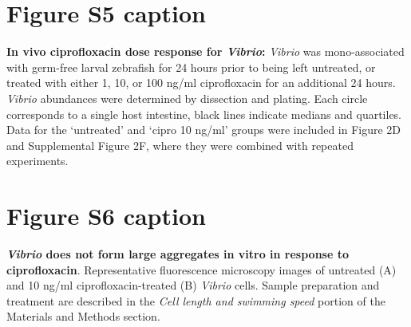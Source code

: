 \section*{Figure S5 caption}
\textbf{In vivo ciprofloxacin dose response for \textit{Vibrio}:} \textit{Vibrio} was mono-associated with germ-free larval zebrafish for 24 hours prior to being left untreated, or treated with either 1, 10, or 100 ng/ml ciprofloxacin for an additional 24 hours.  \textit{Vibrio} abundances were determined by dissection and plating. Each circle corresponds to a single host intestine, black lines indicate medians and quartiles. Data for the `untreated' and `cipro 10 ng/ml' groups were included in Figure 2D and Supplemental Figure 2F, where they were combined with repeated experiments. 

\section*{Figure S6 caption}
\textbf{\textit{Vibrio} does not form large aggregates in vitro in response to ciprofloxacin}. Representative fluorescence microscopy images of untreated (A) and 10 ng/ml ciprofloxacin-treated (B) \textit{Vibrio} cells. Sample preparation and treatment are described in the \textit{Cell length and swimming speed} portion of the Materials and Methods section.

